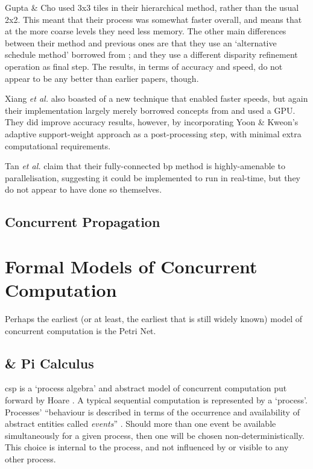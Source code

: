 Gupta \& Cho \cite{Gupta2012} used 3x3 tiles in their hierarchical method, rather than the usual 2x2.  This meant that their process was somewhat faster overall, and means that at the more coarse levels they need less memory.  The other main differences between their method and previous ones are that they use an `alternative schedule method' borrowed from \cite{Tappen2003}; and they use a different disparity refinement operation as final step.  The results, in terms of accuracy and speed, do not appear to be any better than earlier papers, though.

Xiang \textit{et al.} \cite{Xiang2012} also boasted of a new technique that enabled faster speeds, but again their implementation largely merely borrowed concepts from \cite{Felzenszwalb2006} and used a GPU.  They did improve accuracy results, however, by incorporating Yoon \& Kweon's \cite{Yoon2005} adaptive support-weight approach as a post-processing step, with minimal extra computational requirements.

Tan \textit{et al.} \cite{Tan2017} claim that their fully-connected \gls{bp} method is highly-amenable to parallelisation, suggesting it could be implemented to run in real-time, but they do not appear to have done so themselves.


\subsection{Concurrent Propagation}

\cite{Gong2015,Gong2013a}

\section{Formal Models of Concurrent Computation}
Perhaps the earliest (or at least, the earliest that is still widely known) model of concurrent computation is the Petri Net.

\cite{Varela2013}

\subsection{ \& Pi Calculus}
\gls{csp} is a `process algebra' and abstract model of concurrent computation put forward by Hoare \cite{Hoare1985,Roscoe2011}.  A typical sequential computation is represented by a `process'.  Processes' ``behaviour is described in terms of the occurrence and availability of abstract entities called \textit{events}'' \cite[p.~478]{Roscoe2011}.  Should more than one event be available simultaneously for a given process, then one will be chosen non-deterministically.  This choice is internal to the process, and not influenced by or visible to any other process.  %

